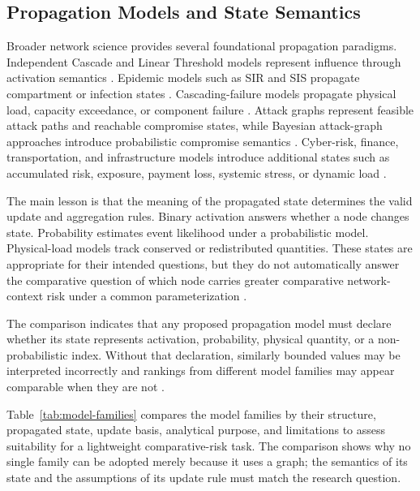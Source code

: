 \subsection{Propagation Models and State
Semantics}\label{propagation-models-and-state-semantics}

Broader network science provides several foundational propagation
paradigms. Independent Cascade and Linear Threshold models represent
influence through activation semantics \citep{kempe2003}. Epidemic models such as
SIR and SIS propagate compartment or infection states \citep{kermack1927,pastor2001,humphries2021}.
Cascading-failure models propagate physical load, capacity exceedance,
or component failure \citep{buldyrev2010,he2019,shuang2017}. Attack graphs represent feasible
attack paths and reachable compromise states, while Bayesian
attack-graph approaches introduce probabilistic compromise semantics
\citep{sheyner2002,munoz2017}. Cyber-risk, finance, transportation, and
infrastructure models introduce additional states such as accumulated
risk, exposure, payment loss, systemic stress, or dynamic load
\citep{kavallieratos2021,faraji2026,zhou2023,wu2026,petrone2018}.

The main lesson is that the meaning of the propagated state determines
the valid update and aggregation rules. Binary activation answers
whether a node changes state. Probability estimates event likelihood
under a probabilistic model. Physical-load models track conserved or
redistributed quantities. These states are appropriate for their
intended questions, but they do not automatically answer the comparative
question of which node carries greater comparative network-context risk
under a common parameterization \citep{kempe2003,kermack1927,buldyrev2010,
sheyner2002,kavallieratos2021}.

The comparison indicates that any proposed propagation model must declare
whether its state represents activation, probability, physical quantity,
or a non-probabilistic index. Without that declaration, similarly bounded
values may be interpreted incorrectly and rankings from different model
families may appear comparable when they are not \citep{kempe2003,
kermack1927,munoz2017,petrone2018}.

Table~\ref{tab:model-families} compares the model families by their
structure, propagated state, update basis, analytical purpose, and
limitations to assess suitability for a lightweight comparative-risk task. The comparison shows why no single family can be
adopted merely because it uses a graph; the semantics of its state and
the assumptions of its update rule must match the research question.

